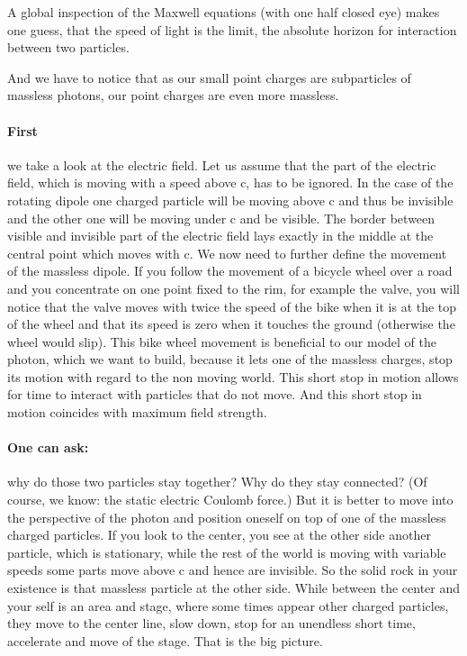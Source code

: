  A global inspection of the Maxwell equations (with one half closed eye) makes one guess, that the speed of light is the limit, the absolute horizon for interaction between two particles.

And we have to notice that as our small point charges are subparticles of massless photons, our point charges are even more massless. 

\paragraph{
First} we take a look at the electric field. Let us assume that the part of the electric field, which is moving with a speed above c, has to be ignored.
In the case of the rotating dipole one charged particle will be moving above c and thus be invisible and the other one will be moving under c and be visible. The border between visible and invisible part of the electric field lays exactly in the middle at the central point which moves with c.
We now need to further define the movement of the massless dipole. If you follow the movement of a bicycle wheel over a road and you concentrate on one point fixed to the rim, for example the valve, you will notice that the valve moves with twice the speed of the bike when it is at the top of the wheel and that its speed is zero when it touches the ground (otherwise the wheel would slip). This bike wheel movement is beneficial to our model of the photon, which we want to build, because it lets one of the massless charges, stop its motion with regard to the non moving world. This short stop in motion allows for time to interact with particles that do not move. And this short stop in motion coincides with maximum field strength.

\paragraph{
One  can ask:} why do those two particles stay together? Why do they stay connected? (Of course, we know: the static electric Coulomb force.) But it is better to move into the perspective of the photon and position oneself on top of one of the massless charged particles. If you look to the center, you see at the other side another particle, which is stationary, while the rest of the world is moving with variable speeds some parts move above c and hence are invisible. So the solid rock in your existence is that massless particle at the other side. While between the center and your self is an area and stage, where some times appear other charged particles, they move to the center line, slow down, stop for an unendless short time, accelerate and move of the stage. That is the big picture.

